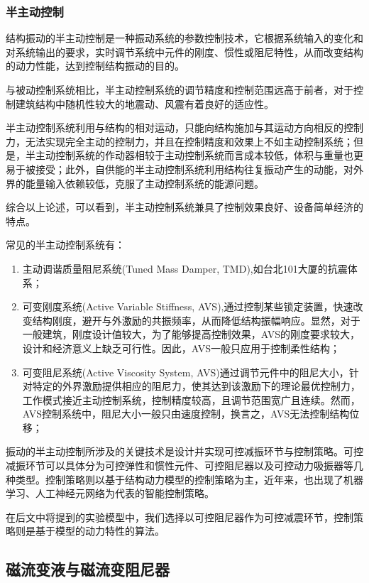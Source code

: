 \subsubsection{半主动控制}
结构振动的半主动控制是一种振动系统的参数控制技术，它根据系统输入的变化和对系统输出的要求，实时调节系统中元件的刚度、惯性或阻尼特性，从而改变结构的动力性能，达到控制结构振动的目的。

与被动控制系统相比，半主动控制系统的调节精度和控制范围远高于前者，对于控制建筑结构中随机性较大的地震动、风震有着良好的适应性。

半主动控制系统利用与结构的相对运动，只能向结构施加与其运动方向相反的控制力，无法实现完全主动的控制力，并且在控制精度和效果上不如主动控制系统；但是，半主动控制系统的作动器相较于主动控制系统而言成本较低，体积与重量也更易于被接受；此外，自供能的半主动控制系统利用结构往复振动产生的动能，对外界的能量输入依赖较低，克服了主动控制系统的能源问题。

综合以上论述，可以看到，半主动控制系统兼具了控制效果良好、设备简单经济的特点。

常见的半主动控制系统有：
\begin{enumerate}[leftmargin=*,labelindent=16pt,label=\bfseries \arabic*.]
	\item 主动调谐质量阻尼系统(Tuned Mass Damper, TMD),如台北101大厦的抗震体系；
	\item 可变刚度系统(Active Variable Stiffness, AVS),通过控制某些锁定装置，快速改变结构刚度，避开与外激励的共振频率，从而降低结构振幅响应。\cite{Lijing2006}显然，对于一般建筑，刚度设计值较大，为了能够提高控制效果，AVS的刚度要求较大，设计和经济意义上缺乏可行性。因此，AVS一般只应用于控制柔性结构；
	\item 可变阻尼系统(Active Viscosity System, AVS)通过调节元件中的阻尼大小，针对特定的外界激励提供相应的阻尼力，使其达到该激励下的理论最优控制力，工作模式接近主动控制系统，控制精度较高，且调节范围宽广且连续。然而，AVS控制系统中，阻尼大小一般只由速度控制，换言之，AVS无法控制结构位移；
\end{enumerate}

振动的半主动控制所涉及的关键技术是设计并实现可控减振环节与控制策略。\cite{Hu2001}可控减振环节可以具体分为可控弹性和惯性元件、可控阻尼器以及可控动力吸振器等几种类型。控制策略则以基于结构动力模型的控制策略为主，近年来，也出现了机器学习、人工神经元网络为代表的智能控制策略。

在后文中将提到的实验模型中，我们选择以可控阻尼器作为可控减震环节，控制策略则是基于模型的动力特性的算法。

\subsection{磁流变液与磁流变阻尼器}
